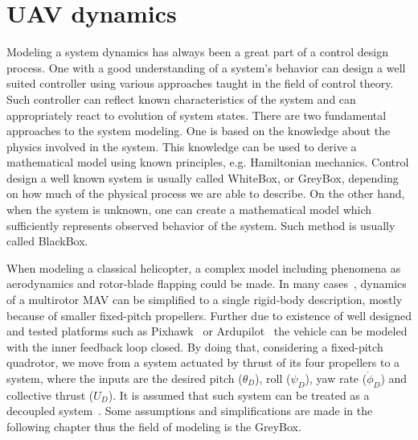 \section{UAV dynamics}
\label{chap:uav_dynamics}

Modeling a system dynamics has always been a great part of a control design process. One with a good understanding of a system's behavior can design a well suited controller using various approaches taught in the field of control theory. Such controller can reflect known characteristics of the system and can appropriately react to evolution of system states. There are two fundamental approaches to the system modeling. One is based on the knowledge about the physics involved in the system. This knowledge can be used to derive a mathematical model using known principles, e.g. Hamiltonian mechanics. Control design a well known system is usually called WhiteBox, or GreyBox, depending on how much of the physical process we are able to describe. On the other hand, when the system is unknown, one can create a mathematical model which sufficiently represents observed behavior of the system. Such method is usually called BlackBox.

When modeling a classical helicopter, a complex model including phenomena as aerodynamics and rotor-blade flapping could be made. In many cases~\citep{alexis2014robust}\citep{mahony2012multirotor}, dynamics of a multirotor MAV can be simplified to a single rigid-body description, mostly because of smaller fixed-pitch propellers. Further due to existence of well designed and tested platforms such as Pixhawk~\citep{pixhawk} or Ardupilot~\citep{ardupilot} the vehicle can be modeled with the inner feedback loop closed. By doing that, considering a fixed-pitch quadrotor, we move from a system actuated by thrust of its four propellers to a system, where the inputs are the desired pitch ($\theta_D$), roll ($\psi_D$), yaw rate ($\dot{\phi}_D$) and collective thrust ($U_D$). It is assumed that such system can be treated as a decoupled system~\citep{mahony2012multirotor}. Some assumptions and simplifications are made in the following chapter thus the field of modeling is the GreyBox.


